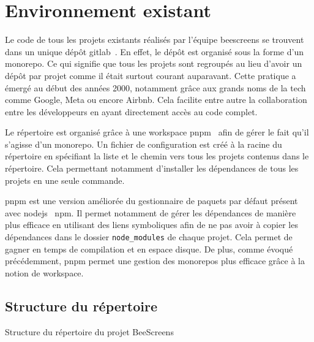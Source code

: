 \section{Environnement existant}

Le code de tous les projets existants réalisés par l'équipe \gls{beescreens} se trouvent dans un unique dépôt \gls{gitlab}~\cite{beescreens}. En effet, le dépôt est organisé sous la forme d'un monorepo. Ce qui signifie que  tous les projets sont regroupés au lieu d'avoir un dépôt par projet comme il était surtout courant auparavant. Cette pratique a émergé au début des années 2000, notamment grâce aux grands noms de la tech comme Google, Meta ou encore Airbnb. Cela facilite entre autre la collaboration entre les développeurs en ayant directement accès au code complet.

Le répertoire est organisé grâce à une workspace \gls{pnpm}~\cite{pnpmworkspace} afin de gérer le fait qu'il s'agisse d'un monorepo. Un fichier de configuration est créé à la racine du répertoire en spécifiant la liste et le chemin vers tous les projets contenus dans le répertoire. Cela permettant notamment d'installer les dépendances de tous les projets en une seule commande.

\gls{pnpm} est une version améliorée du gestionnaire de paquets par défaut présent avec \gls{nodejs}~\cite{nodejs} \gls{npm}. Il permet notamment de gérer les dépendances de manière plus efficace en utilisant des liens symboliques afin de ne pas avoir à copier les dépendances dans le dossier \texttt{node\_modules} de chaque projet. Cela permet de gagner en temps de compilation et en espace disque. De plus, comme évoqué précédemment, \gls{pnpm} permet une gestion des monorepos plus efficace grâce à la notion de workspace.

\subsection{Structure du répertoire}

\begin{listing}[H]
  \begin{tcolorbox}[arc=0mm,colback=white!5!white]
  \end{tcolorbox}
  \caption{Structure du répertoire du projet BeeScreens}
  \label{listing:beescreeens-repo-structure}
\end{listing}

